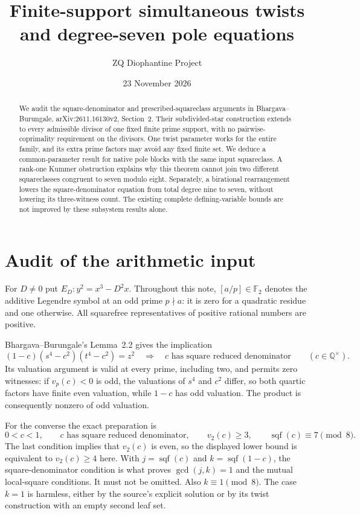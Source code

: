 \documentclass[11pt,a4paper]{article}
\title{Finite-support simultaneous twists and degree-seven pole equations}
\author{ZQ Diophantine Project}
\date{23 November 2026}
\theoremstyle{remark}\newtheorem{remark}[theorem]{Remark}
\newcommand{\Q}{\mathbb Q}\newcommand{\Z}{\mathbb Z}\newcommand{\F}{\mathbb F}
\DeclareMathOperator{\sqf}{sqf}\DeclareMathOperator{\Cl}{Cl}
\begin{document}
\maketitle
\begin{abstract}
We audit the square-denominator and prescribed-squareclass arguments in
Bhargava--Burungale, arXiv:2611.16130v2, Section~2. Their subdivided-star
construction extends to every admissible divisor of one fixed finite
prime support, with no pairwise-coprimality requirement on the divisors.
One twist parameter works for the entire family, and its extra prime
factors may avoid any fixed finite set. We deduce a common-parameter
result for native pole blocks with the same input squareclass. A
rank-one Kummer obstruction explains why this theorem cannot join two
different squareclasses congruent to seven modulo eight. Separately,
a birational rearrangement lowers the square-denominator equation from
total degree nine to seven, without lowering its three-witness count.
The existing complete defining-variable bounds are not improved by
these subsystem results alone.
\end{abstract}

\section{Audit of the arithmetic input}
For $D\ne0$ put $E_D:y^2=x^3-D^2x$. Throughout this note,
$[a/p]\in\F_2$ denotes the additive Legendre symbol at an odd prime
$p\nmid a$: it is zero for a quadratic residue and one otherwise.
All squarefree representatives of positive rational numbers are positive.

Bhargava--Burungale's Lemma~2.2 gives the implication
\begin{equation}\label{eq:BB}
 (1-c)(s^4-c^2)(t^4-c^2)=z^2
 \quad\Longrightarrow\quad c\text{ has square reduced denominator}
 \qquad(c\in\Q^\times).
\end{equation}
Its valuation argument is valid at every prime, including two, and
permits zero witnesses: if $v_p(c)<0$ is odd, the valuations of
$s^4$ and $c^2$ differ, so both quartic factors have finite even
valuation, while $1-c$ has odd valuation. The product is consequently
nonzero of odd valuation.

For the converse the exact preparation is
\begin{equation}\label{eq:prep}
 0<c<1,\qquad c\text{ has square reduced denominator},\qquad
 v_2(c)\ge3,\qquad\sqf(c)\equiv7\pmod8.
\end{equation}
The last condition implies that $v_2(c)$ is even, so the displayed
lower bound is equivalent to $v_2(c)\ge4$ here. With
$j=\sqf(c)$ and $k=\sqf(1-c)$, the square-denominator condition
is what proves $\gcd(j,k)=1$ and the mutual local-square conditions.
It must not be omitted. Also $k\equiv1\pmod8$.
The case $k=1$ is harmless, either by the source's explicit solution
or by its twist construction with an empty second leaf set.
\end{document}
